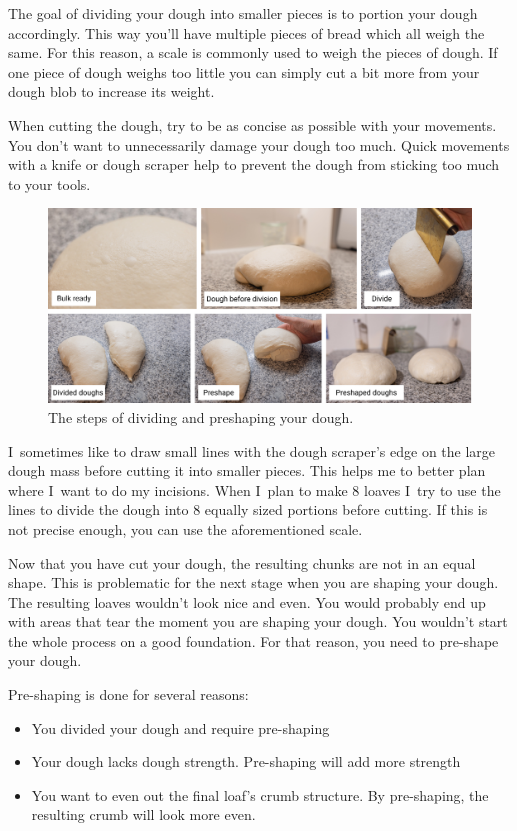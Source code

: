The goal of dividing your dough into smaller pieces is to portion
your dough accordingly. This way you'll have multiple pieces of bread
which all weigh the same. For this reason, a scale is commonly
used to weigh the pieces of dough. If one piece of dough weighs
too little you can simply cut a bit more from your dough blob
to increase its weight.

When cutting the dough, try to be as concise as possible with your
movements. You don't want to unnecessarily damage your dough too much.
Quick movements with a knife or dough scraper help to prevent the
dough from sticking too much to your tools.

\begin{figure}[!htb]
  \includegraphics[width=\textwidth]{divide-preshape}
  \caption{The steps of dividing and preshaping your dough.}
\end{figure}

I~sometimes like to draw small lines with the dough scraper's edge
on the large dough mass before cutting it into smaller pieces.
This helps me to better plan where I~want to do my incisions. When
I~plan to make 8 loaves I~try to use the lines to divide the dough
into 8 equally sized portions before cutting. If this is not precise enough,
you can use the aforementioned scale.

Now that you have cut your dough, the resulting chunks are not in an equal shape.
This is problematic for the next stage when you are shaping your dough.
The resulting loaves wouldn't look nice and even. You would probably
end up with areas that tear the moment you are shaping your dough.
You wouldn't start the whole process on a good foundation. For that
reason, you need to pre-shape your dough.

Pre-shaping is done for several reasons:
\begin{itemize}
  \item You divided your dough and require pre-shaping
  \item Your dough lacks dough strength. Pre-shaping will add more strength
  \item You want to even out the final loaf's crumb structure. By pre-shaping,
  the resulting crumb will look more even.
\end{itemize}

